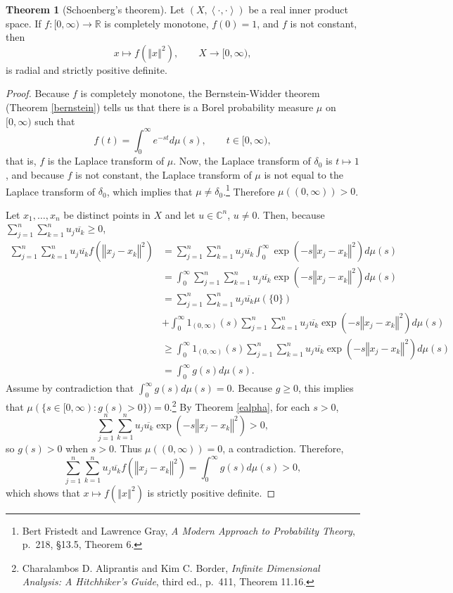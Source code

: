 \documentclass{article}
\newcommand{\inner}[2]{\left\langle #1, #2 \right\rangle}
\newcommand{\norm}[1]{\left\Vert #1 \right\Vert}
\theoremstyle{definition}
\newtheorem{theorem}{Theorem}
\theoremstyle{definition}
\begin{document}
\begin{theorem}[Schoenberg's theorem]
Let $(X,\inner{\cdot}{\cdot})$ be a real  inner product space.
If $f:[0,\infty) \to \mathbb{R}$ is completely monotone, $f(0)=1$,  and $f$ is not constant, then
\[
x \mapsto f(\norm{x}^2), \qquad X \to [0,\infty),
\]
is radial and strictly positive definite.
\end{theorem}
\begin{proof}
Because $f$ is completely monotone, the Bernstein-Widder theorem (Theorem \ref{bernstein}) tells us that
there is a Borel probability measure $\mu$ on $[0,\infty)$ such that
\[
f(t) = \int_0^\infty e^{-st} d\mu(s),\qquad t \in [0,\infty),
\]
that is, $f$ is the Laplace transform of $\mu$. Now, the Laplace transform of $\delta_0$ is $t \mapsto 1$,
and because $f$ is not constant, the Laplace transform of $\mu$ is not equal to the Laplace transform of $\delta_0$,
which implies that $\mu \neq \delta_0$.\footnote{Bert Fristedt and Lawrence Gray, {\em A Modern Approach
to Probability Theory},
p.~218, \S 13.5, Theorem 6.} Therefore $\mu((0,\infty))>0$. 


Let $x_1,\ldots,x_n$ be distinct points in $X$ and let $u \in \mathbb{C}^n$, $u \neq 0$. Then, because
$\sum_{j=1}^n \sum_{k=1}^n u_j \overline{u_k} \geq 0$,
\begin{align*}
\sum_{j=1}^n \sum_{k=1}^n u_j \overline{u_k} f(\norm{x_j-x_k}^2)&=
\sum_{j=1}^n \sum_{k=1}^n u_j \overline{u_k} \int_0^\infty \exp\left(-s \norm{x_j-x_k}^2 \right) d\mu(s)\\
&=\int_0^\infty \sum_{j=1}^n \sum_{k=1}^n u_j \overline{u_k} \exp\left(-s \norm{x_j -  x_k}^2\right) d\mu(s)\\
&=\sum_{j=1}^n \sum_{k=1}^n u_j \overline{u_k} \mu(\{0\})\\
&+\int_0^\infty 1_{(0,\infty)}(s)  \sum_{j=1}^n \sum_{k=1}^n u_j \overline{u_k} \exp\left(-s \norm{x_j -  x_k}^2\right) d\mu(s)\\
&\geq\int_0^\infty 1_{(0,\infty)}(s)  \sum_{j=1}^n \sum_{k=1}^n u_j \overline{u_k} \exp\left(-s \norm{x_j -  x_k}^2\right) d\mu(s)\\
&=\int_0^\infty g(s) d\mu(s).
\end{align*}
Assume by contradiction that $\int_0^\infty g(s) d\mu(s)=0$. Because
$g \geq 0$, this implies that
$\mu(\{s \in [0,\infty): g(s)>0\})=0$.\footnote{Charalambos D. Aliprantis
and Kim C. Border, {\em Infinite Dimensional Analysis: A Hitchhiker's Guide}, third ed., p.~411, Theorem 11.16.}
By Theorem \ref{ealpha}, for each $s>0$,
\[
\sum_{j=1}^n \sum_{k=1}^n u_j \overline{u_k} \exp\left(-s \norm{x_j -  x_k}^2\right) >0,
\]
so $g(s)>0$ when  $s>0$. Thus $\mu((0,\infty))=0$, a contradiction. Therefore,
\[
\sum_{j=1}^n \sum_{k=1}^n u_j \overline{u_k} f(\norm{x_j-x_k}^2) = \int_0^\infty g(s) d\mu(s)>0,
\]
which shows that $x \mapsto f(\norm{x}^2)$ is strictly positive definite. 
\end{proof}
\end{document}
